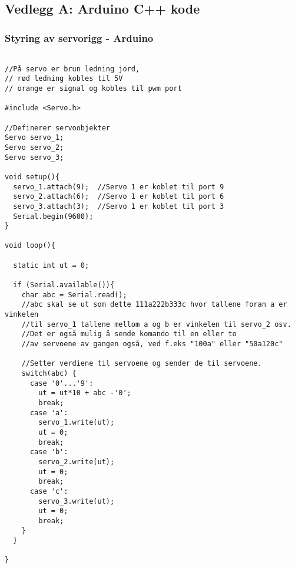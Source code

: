 \subsection{Vedlegg A: Arduino C++ kode}

\begin{frame}
\frametitle{Styring av servorigg - Arduino}
\begin{lstlisting}

//På servo er brun ledning jord, 
// rød ledning kobles til 5V 
// orange er signal og kobles til pwm port

#include <Servo.h>

//Definerer servoobjekter
Servo servo_1; 
Servo servo_2;
Servo servo_3;

void setup(){
  servo_1.attach(9);  //Servo 1 er koblet til port 9
  servo_2.attach(6);  //Servo 1 er koblet til port 6
  servo_3.attach(3);  //Servo 1 er koblet til port 3
  Serial.begin(9600);
}

void loop(){
  
  static int ut = 0;
  
  if (Serial.available()){
    char abc = Serial.read(); 
    //abc skal se ut som dette 111a222b333c hvor tallene foran a er vinkelen 
    //til servo_1 tallene mellom a og b er vinkelen til servo_2 osv.
    //Det er også mulig å sende komando til en eller to 
    //av servoene av gangen også, ved f.eks "100a" eller "50a120c"
    
    //Setter verdiene til servoene og sender de til servoene.
    switch(abc) {
      case '0'...'9':
        ut = ut*10 + abc -'0';
        break;
      case 'a':
        servo_1.write(ut);
        ut = 0;
        break;
      case 'b':
        servo_2.write(ut);
        ut = 0;
        break;
      case 'c':
        servo_3.write(ut);
        ut = 0;
        break;
    }
  }
  
}  

\end{lstlisting}
\end{frame}